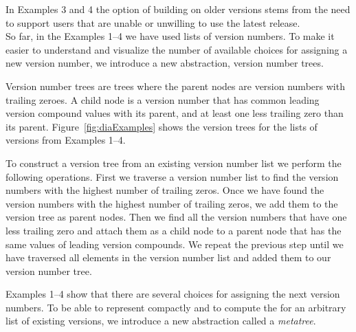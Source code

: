 \documentclass[conference]{IEEEtran}
\begin{document}
In Examples 3 and 4 the option of building on older versions stems from the need to support users that are unable or unwilling to use the latest release.\\

So far, in the Examples 1--4 we have used lists of version numbers. To make it easier to understand and visualize the number of available choices for assigning a new version number, we introduce a new abstraction, version number trees.

Version number trees are trees where the parent nodes are version numbers with trailing zeroes. A child node is a version number that has common leading version compound values with its parent, and at least one less trailing zero than its parent.
Figure~\ref{fig:diaExamples} shows the version trees for the lists of versions from Examples 1--4.

To construct a version tree from an existing version number list we perform the following operations.
First we traverse a version number list to find the version numbers with the highest number of trailing zeros.
Once we have found the version numbers with the highest number of trailing zeros, we add them to the version tree as parent nodes.
Then we find all the version numbers that have one less trailing zero and attach them as a child node to a parent node that has the same values of leading version compounds.
We repeat the previous step until we have traversed all elements in the version number list and added them to our version number tree.





Examples 1--4 show that there are several choices for assigning the next version numbers. To be able to represent compactly and to compute the \numberchoices for an arbitrary list of existing versions, we introduce a new abstraction called a \emph{metatree}. 

\end{document}
